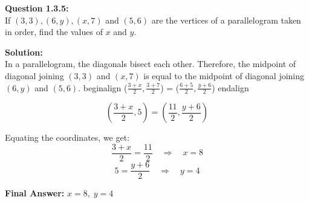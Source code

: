 \documentclass[journal]{IEEEtran}
\begin{document}

\textbf{Question 1.3.5:} \\
If $(3,3), (6,y), (x,7)$ and $(5,6)$ are the vertices of a parallelogram taken in order, 
find the values of $x$ and $y$.

\bigskip
\textbf{Solution:} \\
In a parallelogram, the diagonals bisect each other. Therefore, the midpoint of diagonal 
joining $(3,3)$ and $(x,7)$ is equal to the midpoint of diagonal joining $(6,y)$ and $(5,6)$.
begin{align}
($\frac{3+x}{2}, \frac{3+7}{2}$) 
= ($\frac{6+5}{2}, \frac{y+6}{2}$)
end{align}

\[
\left(\frac{3+x}{2}, 5\right) = \left(\frac{11}{2}, \frac{y+6}{2}\right)
\]

Equating the coordinates, we get:
\[
\frac{3+x}{2} = \frac{11}{2} \quad \Rightarrow \quad x=8
\]
\[
5 = \frac{y+6}{2} \quad \Rightarrow \quad y=4
\]

\bigskip
\textbf{Final Answer:} \quad $x=8, \; y=4$
\end{document}
